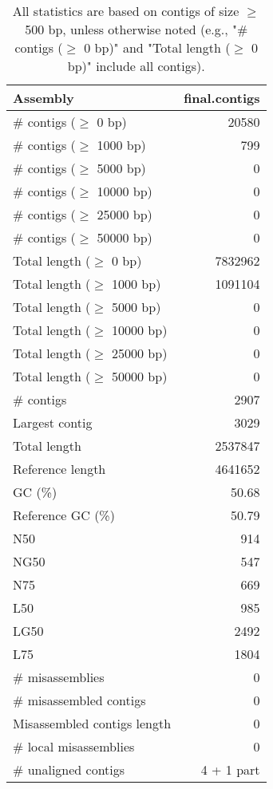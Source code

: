 \documentclass[12pt,a4paper]{article}
\begin{document}
\begin{table}[ht]
\begin{center}
\caption{All statistics are based on contigs of size $\geq$ 500 bp, unless otherwise noted (e.g., "\# contigs ($\geq$ 0 bp)" and "Total length ($\geq$ 0 bp)" include all contigs).}
\begin{tabular}{|l*{1}{|r}|}
\hline
Assembly & final.contigs \\ \hline
\# contigs ($\geq$ 0 bp) & 20580 \\ \hline
\# contigs ($\geq$ 1000 bp) & 799 \\ \hline
\# contigs ($\geq$ 5000 bp) & 0 \\ \hline
\# contigs ($\geq$ 10000 bp) & 0 \\ \hline
\# contigs ($\geq$ 25000 bp) & 0 \\ \hline
\# contigs ($\geq$ 50000 bp) & 0 \\ \hline
Total length ($\geq$ 0 bp) & 7832962 \\ \hline
Total length ($\geq$ 1000 bp) & 1091104 \\ \hline
Total length ($\geq$ 5000 bp) & 0 \\ \hline
Total length ($\geq$ 10000 bp) & 0 \\ \hline
Total length ($\geq$ 25000 bp) & 0 \\ \hline
Total length ($\geq$ 50000 bp) & 0 \\ \hline
\# contigs & 2907 \\ \hline
Largest contig & 3029 \\ \hline
Total length & 2537847 \\ \hline
Reference length & 4641652 \\ \hline
GC (\%) & 50.68 \\ \hline
Reference GC (\%) & 50.79 \\ \hline
N50 & 914 \\ \hline
NG50 & 547 \\ \hline
N75 & 669 \\ \hline
L50 & 985 \\ \hline
LG50 & 2492 \\ \hline
L75 & 1804 \\ \hline
\# misassemblies & 0 \\ \hline
\# misassembled contigs & 0 \\ \hline
Misassembled contigs length & 0 \\ \hline
\# local misassemblies & 0 \\ \hline
\# unaligned contigs & 4 + 1 part \\ \hline

\end{tabular}
\end{center}
\end{table}
\end{document}
